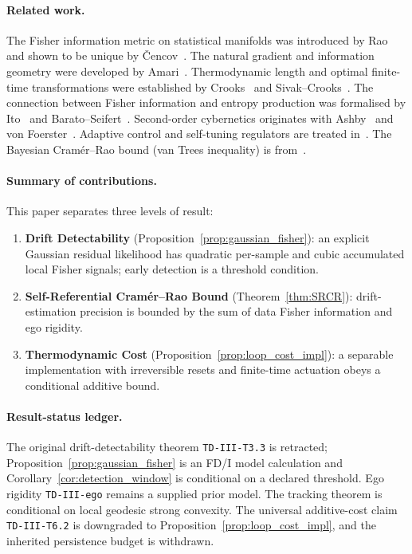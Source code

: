 \documentclass[12pt]{article}
\begin{document}
\paragraph{Related work.}
The Fisher information metric on statistical manifolds was
introduced by Rao~\cite{Rao1945} and shown to be unique
by \v{C}encov~\cite{Cencov1982}.
The natural gradient and information geometry were developed
by Amari~\cite{Amari1998,AmariNagaoka2000}.
Thermodynamic length and optimal finite-time transformations
were established by
Crooks~\cite{Crooks2007} and
Sivak--Crooks~\cite{SivakCrooks2012}.
The connection between Fisher information and entropy
production was formalised by Ito~\cite{Ito2018} and
Barato--Seifert~\cite{BaratoSeifert2015}.
Second-order cybernetics originates with
Ashby~\cite{Ashby1956} and
von Foerster~\cite{vonFoerster2003}.
Adaptive control and self-tuning regulators are treated
in~\cite{AstromWittenmark1995}.
The Bayesian Cram\'{e}r--Rao bound (van Trees inequality)
is from~\cite{vanTrees1968}.

\paragraph{Summary of contributions.}
This paper separates three levels of result:
\begin{enumerate}
\item \textbf{Drift Detectability}
  (Proposition~\ref{prop:gaussian_fisher}): an explicit Gaussian
  residual likelihood has quadratic per-sample and cubic accumulated
  local Fisher signals; early detection is a threshold condition.
\item \textbf{Self-Referential Cram\'{e}r--Rao Bound}
  (Theorem~\ref{thm:SRCR}):
  drift-estimation precision is bounded by the sum of
  data Fisher information and ego rigidity.
\item \textbf{Thermodynamic Cost}
  (Proposition~\ref{prop:loop_cost_impl}): a separable implementation
  with irreversible resets and finite-time actuation obeys a conditional
  additive bound.
\end{enumerate}

\paragraph{Result-status ledger.}
The original drift-detectability theorem
\texttt{TD-III-T3.3} is retracted;
Proposition~\ref{prop:gaussian_fisher} is an FD/I model calculation and
Corollary~\ref{cor:detection_window} is conditional on a declared
threshold.  Ego rigidity \texttt{TD-III-ego} remains a supplied prior
model.  The tracking theorem is conditional on local geodesic strong
convexity.  The universal additive-cost claim
\texttt{TD-III-T6.2} is downgraded to
Proposition~\ref{prop:loop_cost_impl}, and the inherited persistence
budget is withdrawn.
\end{document}
